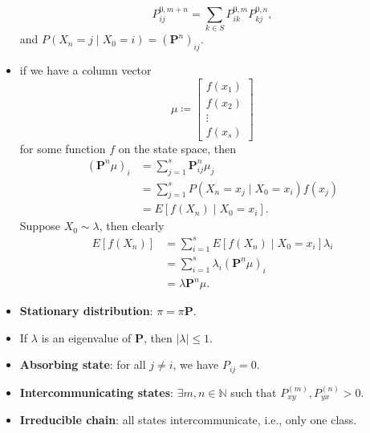 \documentclass[10pt]{article}
\newcommand{\abs}[1]{\left\lvert#1\right\rvert}
\begin{document}
\begin{multicols*}{2}
\begin{itemize}
            \begin{equation*}
                P^{0, m + n}_{ij} = \sum_{k \in S}P^{0, m}_{ik}P^{0, n}_{kj},
            \end{equation*}
            and $P\left(X_n = j \mid X_0 = i\right) = \left(\bm{P}^n\right)_{ij}$.
            \item if we have a column vector 
            \begin{equation*}
                \mu \coloneqq \begin{bmatrix}
                    f\left(x_1\right) \\
                    f\left(x_2\right) \\
                    \vdots \\
                    f\left(x_s\right)
                \end{bmatrix}
            \end{equation*}
            for some function $f$ on the state space, then 
            \begin{align*}
                \left(\bm{P}^n\mu\right)_i & = \sum_{j = 1}^{s}\bm{P}^n_{ij}\mu_j \\
                & = \sum_{j = 1}^{s}P\left(X_n = x_j \mid X_0 = x_i\right)f\left(x_j\right) \\
                & = E\left[f\left(X_n\right) \mid X_0 = x_i\right].
            \end{align*}
            Suppose $X_0 \sim \lambda$, then clearly 
            \begin{align*}
                E\left[f\left(X_n\right)\right] & = \sum_{i = 1}^{s}E\left[f\left(X_n\right) \mid X_0 = x_i\right]\lambda_i \\
                & = \sum_{i = 1}^{s}\lambda_i\left(\bm{P}^n\mu\right)_i \\
                & = \lambda\bm{P}^n\mu.
            \end{align*}
            \item \textbf{Stationary distribution}: $\pi = \pi\bm{P}$.
            \item If $\lambda$ is an eigenvalue of $\bm{P}$, then $\abs{\lambda} \leq 1$.
            \item \textbf{Absorbing state}: for all $j \neq i$, we have $P_{ij} = 0$.
            \item \textbf{Intercommunicating states}: $\exists m, n \in \mathbb{N}$ such that $P_{xy}^{\left(m\right)}, P_{yx}^{\left(n\right)} > 0$.
            \item \textbf{Irreducible chain}: all states intercommunicate, i.e., only one class.

\end{itemize}
\end{multicols*}
\end{document}

